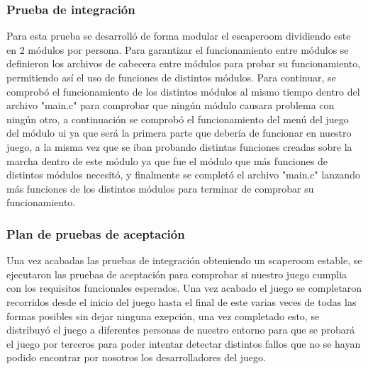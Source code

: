 \subsubsection{Prueba de integración}

Para esta prueba se desarrolló de forma modular el escaperoom dividiendo este en 2 módulos por persona. 
Para garantizar el funcionamiento entre módulos se definieron los archivos de cabecera entre módulos para probar
 su funcionamiento, permitiendo así el uso de funciones de distintos módulos.
Para continuar, se comprobó el funcionamiento de los distintos módulos al mismo tiempo dentro del archivo 
"main.c" para comprobar que ningún módulo causara problema con ningún otro, a continuación se comprobó el funcionamiento 
del menú del juego del módulo ui ya que será la primera parte que debería de funcionar en nuestro juego, a la misma vez que 
se iban probando distintas funciones creadas sobre la marcha dentro de este módulo ya que fue el 
módulo que más funciones de distintos módulos necesitó, y finalmente se
completó el archivo "main.c" lanzando más funciones de los distintos módulos para terminar de comprobar su funcionamiento.  

\subsubsection{ Plan de pruebas de aceptación}

Una vez acabadas las pruebas de integración obteniendo un scaperoom estable, se ejecutaron las pruebas de aceptación para comprobar si nuestro juego cumplia con los requisitos funcionales esperados. Una vez acabado el juego se completaron recorridos desde el inicio del juego hasta el final de este varias veces de todas las formas posibles sin dejar ninguna exepción, una vez completado esto, se distribuyó el juego a diferentes personas de nuestro entorno para que se probará el juego por terceros para poder intentar detectar distintos fallos que no se hayan podido encontrar por nosotros los desarrolladores del juego.

\bigskip
